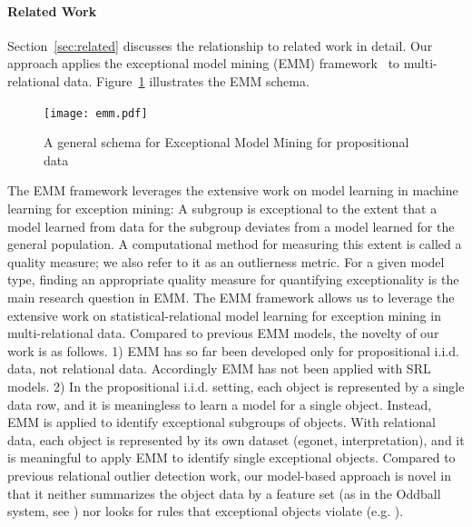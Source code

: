 \documentclass[conference]{IEEEtran}
\begin{document}

\paragraph{Related Work} Section~\ref{sec:related} discusses the relationship to related work in detail. Our approach applies the exceptional model mining (EMM) framework~\cite{Duivesteijn2016} to multi-relational data. Figure~\ref{fig:emm} illustrates the EMM schema. 
\begin{figure}[thbp]
\centering
\texttt{[image: emm.pdf]}
\caption{A general schema for Exceptional Model Mining  for propositional data
\label{fig:emm}}
\end{figure}
The EMM framework leverages the extensive work on model learning in machine learning for exception mining: A subgroup is exceptional to the extent that a model learned from data for the subgroup deviates from a model learned for the general population. A computational method for measuring this extent is called a quality measure; we also refer to it as an outlierness metric. For a given model type, finding an appropriate quality measure for quantifying exceptionality is the main research question in EMM. The EMM framework allows us to leverage the extensive work on statistical-relational model learning for exception mining in multi-relational data. Compared to previous EMM models, the novelty of our work is as follows. 1) EMM has so far been developed only for propositional i.i.d. data, not relational data. Accordingly EMM has not been applied with SRL models. 2) In the propositional i.i.d. setting, each object is represented by a single data row, and it is meaningless to learn a model for a single object. Instead, EMM is applied to identify exceptional subgroups of objects. With relational data, each object is represented by its own dataset (egonet, interpretation), and it is meaningful to apply EMM to identify single exceptional objects. 
%
Compared to previous relational outlier detection work, our model-based approach is novel in that it neither summarizes the object data by a feature set (as in the Oddball system, see \cite{Akoglu2015}) nor looks for rules that exceptional objects violate (e.g. \cite{Maervoet2012}). 
\end{document}
